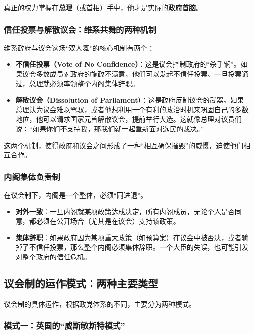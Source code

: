 真正的权力掌握在\textbf{总理}（或首相）手中，他才是实际的\textbf{政府首脑}。

\subsubsection*{信任投票与解散议会：维系共舞的两种机制}

维系政府与议会这场“双人舞”的核心机制有两个：

\begin{itemize}
    \item \textbf{不信任投票（Vote of No Confidence）}：这是议会控制政府的“杀手锏”。如果议会多数成员对政府的施政不满意，他们可以发起不信任投票。一旦投票通过，总理就必须率领整个内阁集体辞职。
    \item \textbf{解散议会（Dissolution of Parliament）}：这是政府反制议会的武器。如果总理认为议会难以驾驭，或者他想利用一个有利的政治时机来巩固自己的多数地位，他可以请求国家元首解散议会，提前举行大选。这就像总理对议员们说：“如果你们不支持我，那我们就一起重新面对选民的裁决。”
\end{itemize}

这两个机制，使得政府和议会之间形成了一种“相互确保摧毁”的威慑，迫使他们相互合作。

\subsubsection*{内阁集体负责制}

在议会制下，内阁是一个整体，必须“同进退”。
\begin{itemize}
    \item \textbf{对外一致}：一旦内阁就某项政策达成决定，所有内阁成员，无论个人是否同意，都必须在公开场合（尤其是在议会）支持该政策。
    \item \textbf{集体辞职}：如果政府因为某项重大政策（如预算案）在议会中被否决，或者输掉了不信任投票，那么整个内阁必须集体辞职。一个大臣的失误，也可能引发对整个政府的信任危机。
\end{itemize}

\subsection{议会制的运作模式：两种主要类型}

议会制的具体运作，根据政党体系的不同，主要分为两种模式。

\subsubsection*{模式一：英国的“威斯敏斯特模式”}

